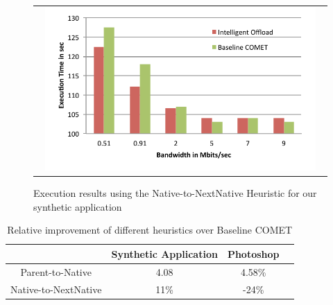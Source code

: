 \begin{figure} [thf*]
\centering
\begin{tabular}{c}
\begin{minipage}[b]{0.5\textwidth}
\includegraphics[width=0.95\textwidth]{figs/h2_sweep.pdf}
\end{minipage}
\end{tabular}
\caption{Execution results using the Native-to-NextNative Heuristic for our synthetic application}
\label{fig:h2_sweep}
\end{figure}

\begin{table}[tbh]
{\small
\centering
\begin{minipage}{0.45\textwidth}
\centering
\begin{tabular}{|c|c|c|c|}
\hline
& Synthetic Application & Photoshop \\
\hline
\hline
Parent-to-Native & 4.08 & 4.58\% \\ \hline
\hline
Native-to-NextNative & 11\%  & -24\%  \\ \hline
 \end{tabular}
\end{minipage}
\caption{Relative improvement of different heuristics over Baseline COMET}
\label{table:heuristic}
\vspace{-6mm}
}
\end{table}




